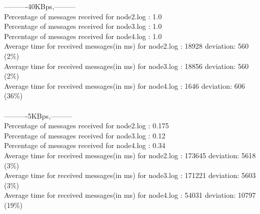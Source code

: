         ----------40KBps,---------\\
        Percentage of messages received for node2.log : 1.0\\
        Percentage of messages received for node3.log : 1.0\\
        Percentage of messages received for node4.log : 1.0\\
        Average time for received messages(in ms) for  node2.log : 18928 	deviation: 560 (2\%)\\
        Average time for received messages(in ms) for  node3.log : 18856 	deviation: 560 (2\%)\\
        Average time for received messages(in ms) for  node4.log : 1646 	deviation: 606 (36\%)\\\\
        ----------5KBps,---------\\
        Percentage of messages received for node2.log : 0.175\\
        Percentage of messages received for node3.log : 0.12\\
        Percentage of messages received for node4.log : 0.34\\
        Average time for received messages(in ms) for  node2.log : 173645 	deviation: 5618 (3\%)\\
        Average time for received messages(in ms) for  node3.log : 171221 	deviation: 5603 (3\%)\\
        Average time for received messages(in ms) for  node4.log : 54031 	deviation: 10797 (19\%)\\\\

